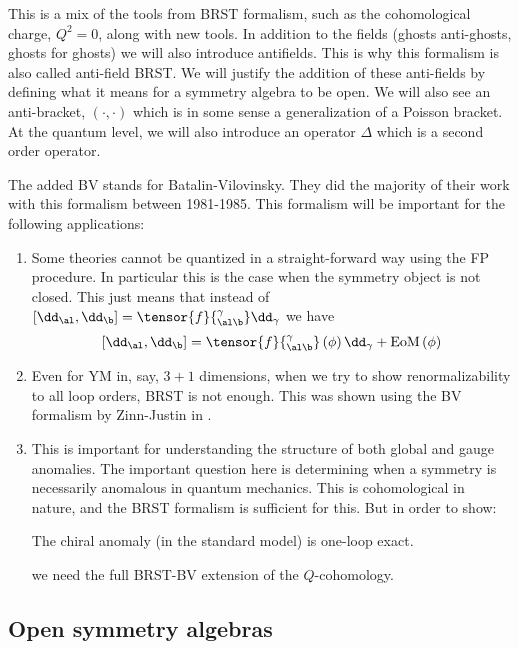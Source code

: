 \documentclass{booc}
\begin{document}
This is a mix of the tools from BRST formalism, such as the cohomological 
charge, $Q^2 = 0$, along with new tools.
In addition to the fields (ghosts anti-ghosts, ghosts for ghosts)
we will also introduce antifields.
This is why this formalism is also called anti-field BRST.
We will justify the addition of these anti-fields by defining
what it means for a symmetry algebra to be open.
We will also see an anti-bracket, $\left( \cdot , \cdot \right)$
which is in some sense a generalization of a Poisson bracket.
At the quantum level, we will also introduce an operator $\Delta$ which
is a second order operator.

The added BV stands for Batalin-Vilovinsky.
They did the majority of their work with this formalism
between 1981-1985. This formalism will be important for the following applications:
\begin{enumerate}
\item Some theories cannot be quantized in a straight-forward way using the FP procedure. 
In particular this is the case when the symmetry object is not closed.
This just means that instead of
$\left[ \dd_\al , \dd_\b \right] = \tensor{f}{_{\al\b}^\gamma} \dd_\gamma$
we have
\begin{equation}
\left[ \dd_\al , \dd_\b \right] = \tensor{f}{_{\al\b}^\gamma}\left( \phi\right) \dd_\gamma 
+ \text{EoM}\left( \phi \right)
\end{equation}

\item Even for YM in, say, $3 + 1$ dimensions, 
when we try to show renormalizability to all loop orders, 
BRST is not enough. This was shown using the BV formalism by Zinn-Justin in \cite{ym_renorm}.

\item This is important for understanding the structure of both global and gauge anomalies. 
The important question here is determining when 
a symmetry is necessarily anomalous in quantum mechanics.
This is cohomological in nature, and the BRST formalism is sufficient for this. 
But in order to show:
\begin{prop}
The chiral anomaly (in the standard model) is one-loop exact.
\end{prop}
we need the full BRST-BV extension of the $Q$-cohomology.
\end{enumerate}

\subsection{Open symmetry algebras}
\end{document}

